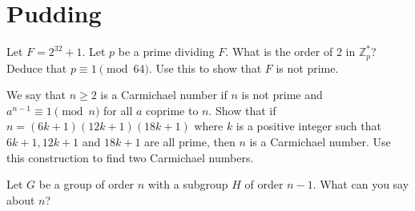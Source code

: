 \documentclass[answers]{exam}
\begin{document}
\section*{Pudding}
\begin{questions}
\question%
Let $F=2^{32}+1$. Let $p$ be a prime dividing $F$. What is the order of 2 in $\mathbb{Z}_{p}^{*}$? Deduce that $p \equiv 1\pmod{64}$. Use this to show that $F$ is not prime.



\question%
We say that $n \geqslant 2$ is a Carmichael number if $n$ is not prime and $a^{n-1} \equiv 1\pmod n$ for all $a$ coprime to $n$. Show that if $n=(6 k+1)(12 k+1)(18 k+1)$ where $k$ is a positive integer such that $6 k+1,12 k+1$ and $18 k+1$ are all prime, then $n$ is a Carmichael number. Use this construction to find two Carmichael numbers.



\question%
Let $G$ be a group of order $n$ with a subgroup $H$ of order $n-1$. What can you say about $n$?

\end{questions}
\end{document}
